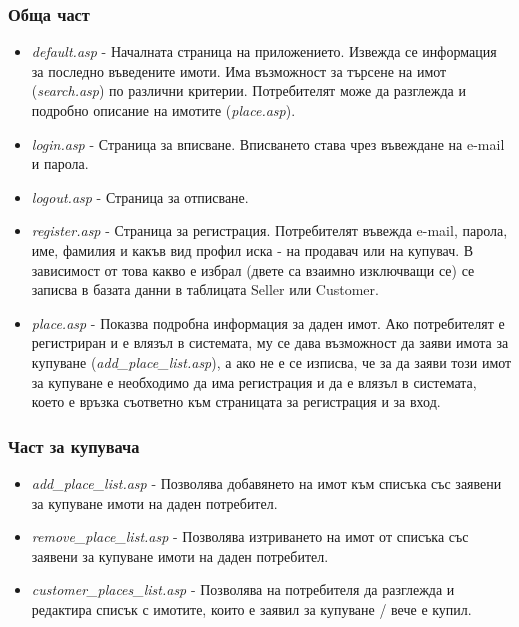 \documentclass[a4paper,12pt, leqno]{article}
\begin{document}
\subsubsection{Обща част}
\begin{itemize}
 \item \textit{default.asp} - Началната страница на приложението. Извежда се информация за последно въведените имоти. 
Има възможност за търсене на имот (\textit{search.asp}) по различни критерии. Потребителят може да разглежда и подробно описание 
на имотите (\textit{place.asp}).
 \item \textit{login.asp} - Страница за вписване. Вписването става чрез въвеждане на e-mail и парола.
 \item \textit{logout.asp} - Страница за отписване.
 \item \textit{register.asp} - Страница за регистрация. Потребителят въвежда e-mail, парола, име, фамилия и
какъв вид профил иска - на продавач или на купувач. В зависимост от това какво е избрал (двете са взаимно изключващи се) 
се записва в базата данни в таблицата Seller или Customer.
 \item \textit{place.asp} - Показва подробна информация за даден имот. Ако потребителят е регистриран и 
е влязъл в системата, му се дава възможност да заяви имота за купуване (\textit{add\_place\_list.asp}), а ако не е 
се изписва, че за да заяви този имот за купуване е необходимо да има регистрация и да е влязъл в системата, което 
е връзка съответно към страницата за регистрация и за вход.
\end{itemize}


\subsubsection{Част за купувача}
\begin{itemize}
 \item \textit{add\_place\_list.asp} - Позволява добавянето на имот към списъка със заявени за купуване имоти на даден
потребител.
 \item \textit{remove\_place\_list.asp} - Позволява изтриването на имот от списъка със заявени за купуване имоти на 
даден потребител.
 \item \textit{customer\_places\_list.asp} - Позволява на потребителя да разглежда и редактира списък с имотите, 
които е заявил за купуване / вече е купил.
\end{itemize}
\end{document}
